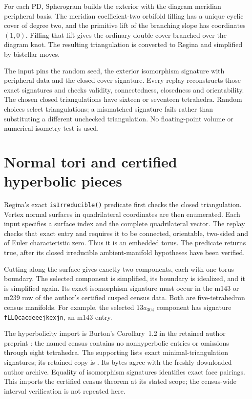 \documentclass[11pt]{article}
\begin{document}
For each PD, Spherogram builds the exterior with the diagram
meridian peripheral basis. The meridian coefficient-two orbifold
filling has a unique cyclic cover of degree two, and the primitive
lift of the branching slope has coordinates $(1,0)$.
Filling that lift gives the ordinary double cover branched over the
diagram knot. The resulting triangulation is converted to Regina
and simplified by bistellar moves.

The input pins the random seed, the exterior isomorphism signature
with peripheral data and the closed-cover signature.
Every replay reconstructs those exact signatures and checks validity,
connectedness, closedness and orientability.
The chosen closed triangulations have sixteen or seventeen tetrahedra.
Random choices select triangulations; a mismatched signature fails
rather than substituting a different unchecked triangulation.
No floating-point volume or numerical isometry test is used.

\section{Normal tori and certified hyperbolic pieces}

Regina's exact \texttt{isIrreducible()} predicate first checks the
closed triangulation. Vertex normal surfaces in quadrilateral
coordinates are then enumerated. Each input specifies a surface index
and the complete quadrilateral vector. The replay checks that exact
entry and requires it to be connected, orientable, two-sided and of
Euler characteristic zero. Thus it is an embedded torus.
The  predicate returns true,
after its closed irreducible ambient-manifold hypotheses have been
verified.

Cutting along the surface gives exactly two components, each with one
torus boundary. The selected component is simplified, its boundary is
idealized, and it is simplified again. Its exact isomorphism signature
must occur in the m143 or m239 row of the author's certified cusped
census data. Both are five-tetrahedron census manifolds.
For example, the selected $13a_{304}$ component has signature
\texttt{fLLQcacdeeejkexjn}, an m143 entry.

The hyperbolicity import is Burton's Corollary~1.2 in the retained
author preprint \cite[printed p.~2]{burton}: the named census contains
no nonhyperbolic entries or omissions through eight tetrahedra.
The supporting  lists exact minimal-triangulation
signatures; its retained copy is
.
Its bytes agree with the freshly downloaded author archive.
Equality of isomorphism signatures identifies exact face pairings.
This imports the certified census theorem at its stated scope;
the census-wide interval verification is not repeated here.
\end{document}
